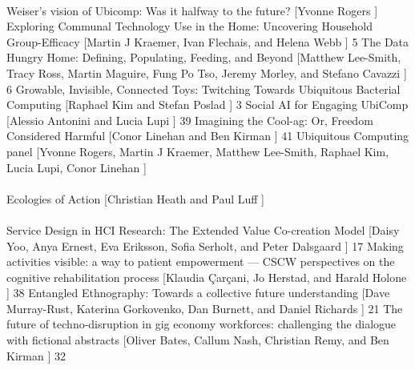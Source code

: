 \begin{sessions}
 \\
    {Weiser’s vision of Ubicomp: Was it halfway to the future?%
}%
    [Yvonne Rogers%
]%
    { 
}
    {Exploring Communal Technology Use in the Home: Uncovering Household Group-Efficacy%
}%
    [Martin J Kraemer, Ivan Flechais, and Helena Webb%
]%
    { 5
}
    {The Data Hungry Home: Defining, Populating, Feeding, and Beyond%
}%
    [Matthew Lee-Smith, Tracy Ross, Martin Maguire, Fung Po Tso, Jeremy Morley, and Stefano Cavazzi%
]%
    { 6
}
    {Growable, Invisible, Connected Toys: Twitching Towards Ubiquitous Bacterial Computing%
}%
    [Raphael Kim and Stefan Poslad%
]%
    { 3
}
    {Social AI for Engaging UbiComp%
}%
    [Alessio Antonini and Lucia Lupi%
]%
    { 39
}
    {Imagining the Cool-ag: Or, Freedom Considered Harmful%
}%
    [Conor Linehan and Ben Kirman%
]%
    { 41
}
    {Ubiquitous Computing panel%
}%
    [Yvonne Rogers, Martin J Kraemer, Matthew Lee-Smith, Raphael Kim, Lucia Lupi, Conor Linehan%
]%
    { 
}
 \\
 \\
    {Ecologies of Action%
}%
    [Christian Heath and Paul Luff%
]%
    { 
}
 \\
 \\
    {Service Design in HCI Research: The Extended Value Co-creation Model%
}%
    [Daisy Yoo, Anya Ernest, Eva Eriksson, Sofia Serholt, and Peter Dalsgaard%
]%
    { 17
}
    {Making activities visible: a way to patient empowerment — CSCW perspectives on the cognitive rehabilitation process%
}%
    [Klaudia Çarçani, Jo Herstad, and Harald Holone%
]%
    { 38
}
    {Entangled Ethnography: Towards a collective future understanding%
}%
    [Dave Murray-Rust, Katerina Gorkovenko, Dan Burnett, and Daniel Richards%
]%
    { 21
}
    {The future of techno-disruption in gig economy workforces: challenging the dialogue with fictional abstracts%
}%
    [Oliver Bates, Callum Nash, Christian Remy, and Ben Kirman%
]%
    { 32
}

\end{sessions}
